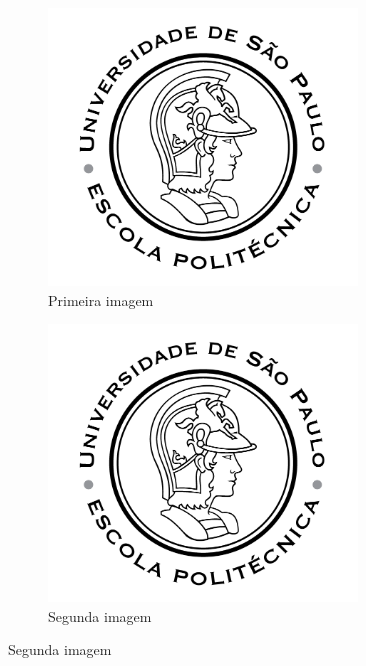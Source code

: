 \begin{figure}[h!]
    \caption{Exemplo com varias imagens}
    \begin{subfigure} {0.5\textwidth}
        \includegraphics[width=0.9\textwidth]{imagens/Poli.png}
        \caption{Primeira imagem}
        \label{fig:poli1}
    \end{subfigure}
    \begin{subfigure}{0.5\textwidth}
        \includegraphics[width=0.9\textwidth]{imagens/Poli.png}
        \caption{Segunda imagem}
        \label{fig:poli2}
    \end{subfigure}

\end{figure}
